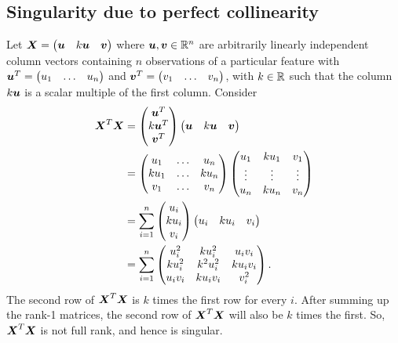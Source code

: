 \documentclass[12pt]{article}
\begin{document}
	\subsection{Singularity due to perfect collinearity \label{sec:append3}}
	Let $\boldsymbol{X}=\begin{pmatrix}
		\boldsymbol{u} & k\boldsymbol{u} & \boldsymbol{v}
	\end{pmatrix}$ where $\bmu,\bmv\in\Rn$ are arbitrarily linearly independent column vectors containing $n$ observations of a particular feature with $\boldsymbol{u}^T=\begin{pmatrix}
		u_1 & \ldots & u_n
	\end{pmatrix}$ and $\boldsymbol{v}^T=\begin{pmatrix}
		v_1 & \ldots & v_n
	\end{pmatrix}$, with $k\in\RR$ such that the column $k\boldsymbol{u}$ is a scalar multiple of the first column. Consider
	\begin{align*}
		\boldsymbol{X}^T\boldsymbol{X}&=\begin{pmatrix}
			\boldsymbol{u}^T \\ k\boldsymbol{u}^T \\ \boldsymbol{v}^T
		\end{pmatrix}\begin{pmatrix}
			\boldsymbol{u} & k\boldsymbol{u} & \boldsymbol{v}
		\end{pmatrix}\\
		&=\begin{pmatrix}
			u_1 & \ldots & u_n \\ ku_1 & \ldots & ku_n \\ v_1 & \ldots & v_n
		\end{pmatrix}\begin{pmatrix}
			u_1 & ku_1 & v_1 \\ \vdots & \vdots & \vdots \\ u_n & ku_n & v_n
		\end{pmatrix}\\
		&=\sum_{i=1}^{n}\begin{pmatrix}
			u_i \\ ku_i \\ v_i
		\end{pmatrix}\begin{pmatrix}
			u_i & ku_i & v_i
		\end{pmatrix}\\
		&=\sum_{i=1}^{n}\begin{pmatrix}
			u_i^2 & ku_i^2 & u_iv_i \\ 
			ku_i^2 & k^2u_i^2 & ku_iv_i \\
			u_iv_i & ku_iv_i & v_i^2
		\end{pmatrix}.
	\end{align*}
	The second row of $\boldsymbol{X}^T\boldsymbol{X}$ is $k$ times the first row for every $i$. After summing up the rank-1 matrices, the second row of $\boldsymbol{X}^T\boldsymbol{X}$ will also be $k$ times the first. So, $\boldsymbol{X}^T\boldsymbol{X}$ is not full rank, and hence is singular. \\
	
\end{document}
